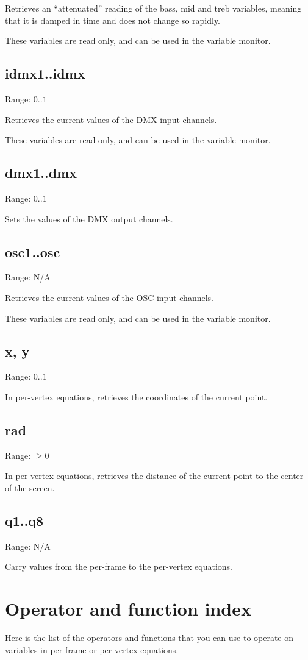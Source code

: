 \documentclass[11pt, a5paper, pagesize]{scrbook}
\begin{document}
Retrieves an ``attenuated'' reading of the bass, mid and treb variables, meaning that it is damped in time and does not change so rapidly.

These variables are read only, and can be used in the variable monitor.

\subsection{idmx1..idmx\nidmx}
Range: $0..1$

Retrieves the current values of the DMX input channels.

These variables are read only, and can be used in the variable monitor.

\subsection{dmx1..dmx\ndmx}
Range: $0..1$

Sets the values of the DMX output channels.

\subsection{osc1..osc\nosc}
Range: N/A

Retrieves the current values of the OSC input channels.

These variables are read only, and can be used in the variable monitor.

\subsection{x, y}
Range: $0..1$

In per-vertex equations, retrieves the coordinates of the current point.

\subsection{rad}
Range: $\geq 0$

In per-vertex equations, retrieves the distance of the current point to the center of the screen.

\subsection{q1..q8}
Range: N/A

Carry values from the per-frame to the per-vertex equations.

\section{Operator and function index}
Here is the list of the operators and functions that you can use to operate on variables in per-frame or per-vertex equations.
\end{document}
